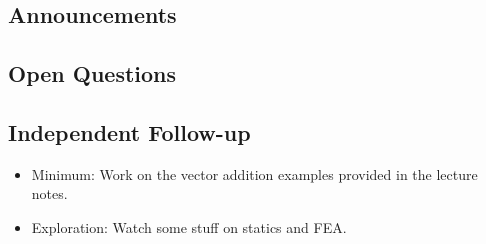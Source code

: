 \subsection*{Announcements}


\subsection*{Open Questions}


\subsection*{Independent Follow-up}
\begin{itemize}
    \item Minimum: Work on the vector addition examples provided in the lecture notes.
    \item Exploration: Watch some stuff on statics and FEA.
\end{itemize}
